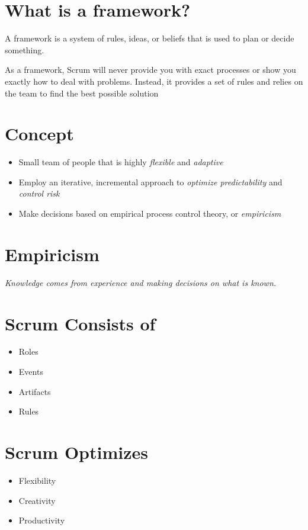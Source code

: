 \documentclass[a4paper,11pt,twocolumn]{article}
\begin{document}
\section*{What is a framework?}
A framework is a system of rules, ideas, or beliefs that is used to plan or decide something.

\begin{tcolorbox}[colback=black!8!white,colframe=gray!50!black,title=Note,sharp corners,fonttitle=\normalsize\bfseries,fontupper=\normalsize,left=0.7em,right=0.7em]
	As a framework, Scrum will never provide you with exact processes or show you exactly how to deal with problems. Instead, it provides a set of rules and relies on the team to find the best possible solution
\end{tcolorbox}

\section*{Concept}
\begin{itemize}
	\item Small team of people that is highly \textit{flexible} and \textit{adaptive}
	\item Employ an iterative, incremental approach to \textit{optimize predictability} and \textit{control risk}
	\item Make decisions based on empirical process control theory, or \textit{empiricism}
\end{itemize}

\section*{Empiricism}
\textit{Knowledge comes from experience and making decisions on what is known.}

\section*{Scrum Consists of}
\begin{itemize}
	\item Roles
	\item Events
	\item Artifacts
	\item Rules
\end{itemize}

\section*{Scrum Optimizes}
\begin{itemize}
	\item Flexibility
	\item Creativity
	\item Productivity
\end{itemize}
\end{document}
